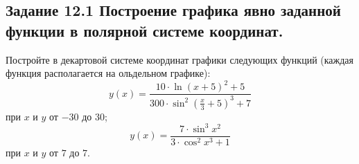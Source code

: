 \subsection*{\textbf{Задание 12.1} Построение графика явно заданной функции в полярной системе координат.}
Постройте в декартовой системе координат графики следующих функций (каждая функция располагается на ольдельном графике):
\[
    y(x) = \frac{10\cdot\ln(x+5)^2 + 5}{300\cdot\sin^2(\frac{x}{3}+5)^3+7}
\]
при $x$ и $y$ от $-30$ до $30$;
\[
    y(x) = \frac{7\cdot\sin^3 x^2}{3\cdot\cos^2x^3+1}
\]
при $x$ и $y$ от $7$ до $7$.

\begin{figure}[H]
    \renewcommand{\figurename}{Рисунок}
    \label{fig:image_12_1}
\end{figure}